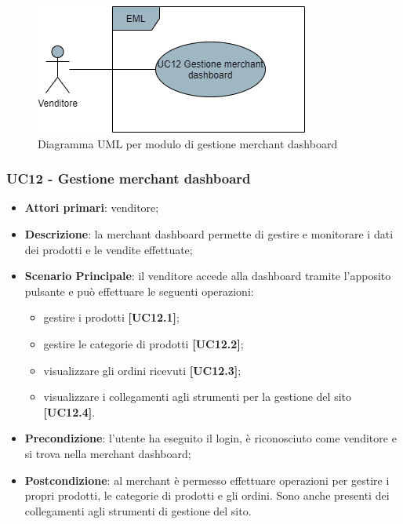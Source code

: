 \begin{figure}[H]
\centering
\includegraphics[scale=0.6]{res/UseCase/Immagini/MerchantDashboardGenerale}
\caption{Diagramma UML per modulo di gestione merchant dashboard}
\end{figure}

\subsubsection{UC12 - Gestione merchant dashboard}
\begin{itemize}
\item \textbf{Attori primari}: venditore;
\item \textbf{Descrizione}: la merchant dashboard permette di gestire e monitorare i dati dei prodotti e le vendite effettuate;
\item \textbf{Scenario Principale}: il venditore accede alla dashboard tramite l'apposito pulsante e può effettuare le seguenti operazioni:
\begin{itemize}
	\item gestire i prodotti \textbf{[UC12.1]};
	\item gestire le categorie di prodotti \textbf{[UC12.2]};
	\item visualizzare gli ordini ricevuti \textbf{[UC12.3]};
	\item visualizzare i collegamenti agli strumenti per la gestione del sito \textbf{[UC12.4]}.
\end{itemize}
\item \textbf{Precondizione}: l'utente ha eseguito il login, è riconosciuto come venditore e si trova nella merchant dashboard;
\item \textbf{Postcondizione}: al merchant è permesso effettuare operazioni per gestire i propri prodotti, le categorie di prodotti e gli ordini. Sono anche presenti dei collegamenti agli strumenti di gestione del sito.
\end{itemize}

